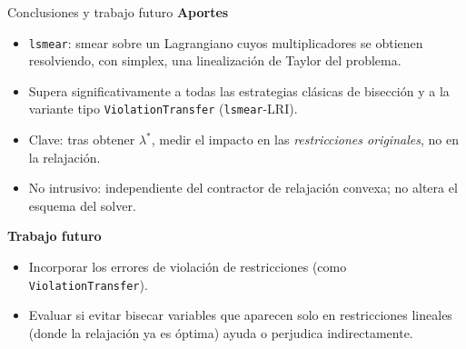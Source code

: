 \documentclass[10pt,aspectratio=169]{beamer}
\newcommand{\ls}{\texttt{lsmear}}
\begin{document}
\begin{frame}{Conclusiones y trabajo futuro}
\textbf{Aportes}
\begin{itemize}
  \item \ls{}: smear sobre un Lagrangiano cuyos multiplicadores se obtienen resolviendo, con simplex, una linealización de Taylor del problema.
  \item Supera significativamente a todas las estrategias clásicas de bisección y a la variante tipo \texttt{ViolationTransfer} (\ls{}-LRI).
  \item Clave: tras obtener $\lambda^*$, medir el impacto en las \emph{restricciones originales}, no en la relajación.
  \item No intrusivo: independiente del contractor de relajación convexa; no altera el esquema del solver.
\end{itemize}
\textbf{Trabajo futuro}
\begin{itemize}
  \item Incorporar los errores de violación de restricciones (como \texttt{ViolationTransfer}).
  \item Evaluar si evitar bisecar variables que aparecen solo en restricciones lineales (donde la relajación ya es óptima) ayuda o perjudica indirectamente.
\end{itemize}
\end{frame}
\end{document}
